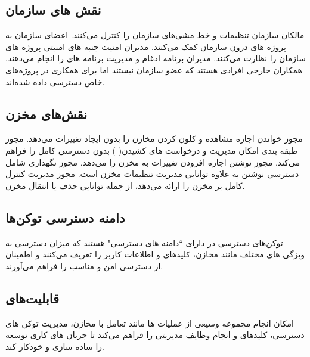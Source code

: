 \documentclass{CSICC}
\begin{document}
   \subsection{نقش‌ های سازمان}
مالکان سازمان تنظیمات و خط‌ مشی‌های سازمان را کنترل می‌کنند.
اعضای سازمان به پروژه‌ های درون سازمان کمک می‌کنند.
مدیران امنیت جنبه ‌های امنیتی پروژه‌ های سازمان را نظارت می‌کنند.
مدیران برنامه
  ادغام و مدیریت برنامه ‌های
    را انجام می‌دهند.
همکاران خارجی افرادی هستند که عضو سازمان نیستند اما برای همکاری در پروژه‌های خاص دسترسی داده شده‌اند.
\subsection{نقش‌های مخزن}
مجوز خواندن اجازه مشاهده و کلون کردن مخازن را بدون ایجاد تغییرات می‌دهد.
مجوز طبقه ‌بندی امکان مدیریت
  و درخواست‌ های کشیدن(
  ) بدون دسترسی کامل را فراهم می‌کند.
مجوز نوشتن اجازه افزودن تغییرات به مخزن را می‌دهد.
مجوز نگهداری شامل دسترسی نوشتن به علاوه توانایی مدیریت تنظیمات مخزن است.
مجوز مدیریت کنترل کامل بر مخزن را ارائه می‌دهد، از جمله توانایی حذف یا انتقال مخزن.
\subsection{دامنه دسترسی توکن‌ها}
توکن‌های دسترسی در
  دارای “دامنه ‌های دسترسی" هستند که میزان دسترسی به ویژگی‌ های مختلف مانند مخازن، کلیدهای
   و اطلاعات کاربر را تعریف می‌کنند و اطمینان از دسترسی امن و مناسب را فراهم می‌آورند.
\subsection{قابلیت‌های
	}   

امکان انجام مجموعه وسیعی از عملیات ‌ها مانند تعامل با مخازن، مدیریت توکن ‌های دسترسی، کلیدهای
  و انجام وظایف مدیریتی را فراهم می‌کند تا جریان‌ های کاری توسعه را ساده‌ سازی و خودکار کند.
\end{document}
